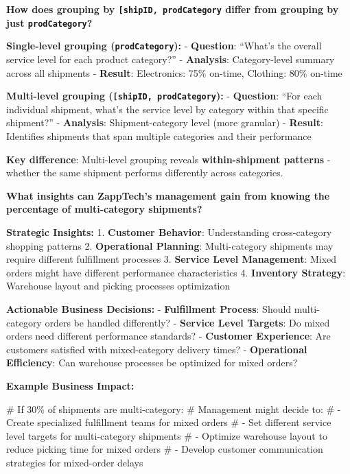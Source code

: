 \documentclass[
  letterpaper,
  DIV=11,
  numbers=noendperiod]{scrartcl}
\newenvironment{Shaded}{\begin{snugshade}}{\end{snugshade}}
\newcommand{\CommentTok}[1]{\textcolor[rgb]{0.37,0.37,0.37}{#1}}
\begin{document}
\textbf{How does grouping by
\texttt{{[}\textquotesingle{}shipID\textquotesingle{},\ \textquotesingle{}prodCategory\textquotesingle{}{]}}
differ from grouping by just
\texttt{\textquotesingle{}prodCategory\textquotesingle{}}?}

\textbf{Single-level grouping
(\texttt{\textquotesingle{}prodCategory\textquotesingle{}}):} -
\textbf{Question}: ``What's the overall service level for each product
category?'' - \textbf{Analysis}: Category-level summary across all
shipments - \textbf{Result}: Electronics: 75\% on-time, Clothing: 80\%
on-time

\textbf{Multi-level grouping
(\texttt{{[}\textquotesingle{}shipID\textquotesingle{},\ \textquotesingle{}prodCategory\textquotesingle{}{]}}):}
- \textbf{Question}: ``For each individual shipment, what's the service
level by category within that specific shipment?'' - \textbf{Analysis}:
Shipment-category level (more granular) - \textbf{Result}: Identifies
shipments that span multiple categories and their performance

\textbf{Key difference}: Multi-level grouping reveals
\textbf{within-shipment patterns} - whether the same shipment performs
differently across categories.

\textbf{What insights can ZappTech's management gain from knowing the
percentage of multi-category shipments?}

\textbf{Strategic Insights:} 1. \textbf{Customer Behavior}:
Understanding cross-category shopping patterns 2. \textbf{Operational
Planning}: Multi-category shipments may require different fulfillment
processes 3. \textbf{Service Level Management}: Mixed orders might have
different performance characteristics 4. \textbf{Inventory Strategy}:
Warehouse layout and picking processes optimization

\textbf{Actionable Business Decisions:} - \textbf{Fulfillment Process}:
Should multi-category orders be handled differently? - \textbf{Service
Level Targets}: Do mixed orders need different performance standards? -
\textbf{Customer Experience}: Are customers satisfied with
mixed-category delivery times? - \textbf{Operational Efficiency}: Can
warehouse processes be optimized for mixed orders?

\textbf{Example Business Impact:}

\begin{Shaded}
\begin{Highlighting}[]
\CommentTok{\# If 30\% of shipments are multi{-}category:}
\CommentTok{\# Management might decide to:}
\CommentTok{\# {-} Create specialized fulfillment teams for mixed orders}
\CommentTok{\# {-} Set different service level targets for multi{-}category shipments}
\CommentTok{\# {-} Optimize warehouse layout to reduce picking time for mixed orders}
\CommentTok{\# {-} Develop customer communication strategies for mixed{-}order delays}
\end{Highlighting}
\end{Shaded}
\end{document}
